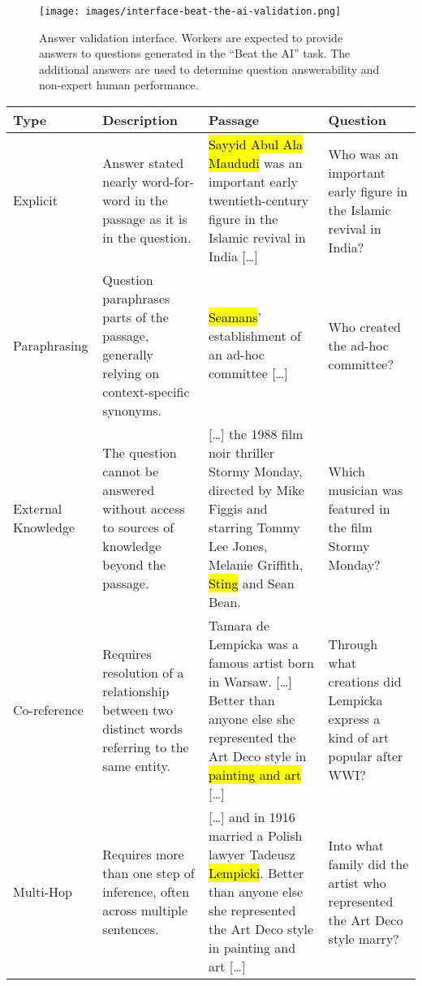 \documentclass[11pt,a4paper]{article}
\DeclareRobustCommand{\hlcustom}[1]{{\sethlcolor{mycol}\hl{#1}}}
\begin{document}
\begin{figure*}[h]
        \centering
        \texttt{[image: images/interface-beat-the-ai-validation.png]}
        \caption{Answer validation interface. Workers are expected to provide answers to questions generated in the ``Beat the AI'' task. The additional answers are used to determine question answerability and non-expert human performance.} 
        \label{fig:interface_validation}
    \end{figure*}


    \clearpage
    
    
    \begin{table*}[ht]
    \footnotesize
    \begin{center}
    \begin{tabular}{p{}p{}p{}p{}}
    \textbf{Type} & \textbf{Description} &  \textbf{Passage} & \textbf{Question} \\
    \toprule
    Explicit    &  Answer stated nearly word-for-word in the passage as it is in the question.  &  \hlcustom{Sayyid Abul Ala Maududi} was an important early twentieth-century figure in the Islamic revival in India [\ldots]   & Who was an important early figure in the Islamic revival in India? \\
    \hline
    Paraphrasing & Question paraphrases parts of the passage, generally relying on context-specific synonyms. & \hlcustom{Seamans}' establishment of an ad-hoc committee [\ldots]  & Who created the ad-hoc committee? \\
    \hline
    External Knowledge & The question cannot be answered without access to sources of knowledge beyond the passage. & [\ldots] the 1988 film noir thriller Stormy Monday, directed by Mike Figgis and starring Tommy Lee Jones, Melanie Griffith, \hlcustom{Sting} and Sean Bean. & Which musician was featured in the film Stormy Monday? \\
    \hline
    Co-reference & Requires resolution of a relationship between two distinct words referring to the same entity. & Tamara de Lempicka was a famous artist born in Warsaw. [\ldots] Better than anyone else she represented the Art Deco style in \hlcustom{painting and art} [\ldots] & Through what creations did Lempicka express a kind of art popular after WWI? \\
    \hline
    Multi-Hop & Requires more than one step of inference, often across multiple sentences. & [\ldots] and in 1916 married a Polish lawyer Tadeusz \hlcustom{Lempicki}. Better than anyone else she represented the Art Deco style in painting and art [\ldots] & Into what family did the artist who represented the Art Deco style marry? \\

\end{tabular}
\end{center}
\end{table*}
\end{document}
